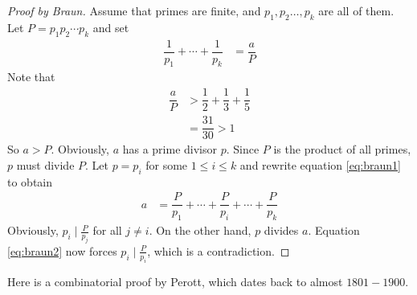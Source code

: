 	\begin{proof}[Proof by Braun]
		Assume that primes are finite, and $p_1, p_2\ldots,p_k$ are all of them. Let $P=p_1p_2\cdots p_k$ and set
			\begin{align}
				\dfrac1{p_1}+\cdots+\dfrac1{p_k} & =\dfrac a{P}\label{eq:braun1}
			\end{align}
		Note that
			\begin{align*}
				\dfrac aP & > \dfrac12+\dfrac13+\dfrac15\\
				& =\dfrac{31}{30}>1
			\end{align*}
		So $a>P$. Obviously, $a$ has a prime divisor $p$. Since $P$ is the product of all primes, $p$ must divide $P$. Let $p=p_i$ for some $1 \leq i \leq k$ and rewrite equation \eqref{eq:braun1} to obtain
			\begin{align}
				a & =\dfrac P{p_1}+\cdots+\dfrac{P}{p_i}+\cdots+\dfrac P{p_k}\label{eq:braun2}
			\end{align}
		Obviously, $p_i \mid  \frac{P}{p_j}$ for all $j \neq i$. On the other hand, $p$ divides $a$. Equation \eqref{eq:braun2} now forces $p_i \mid  \frac{P}{p_i}$, which is a contradiction.
	\end{proof}
Here is a combinatorial proof by Perott, which dates back to almost $1801-1900$.
